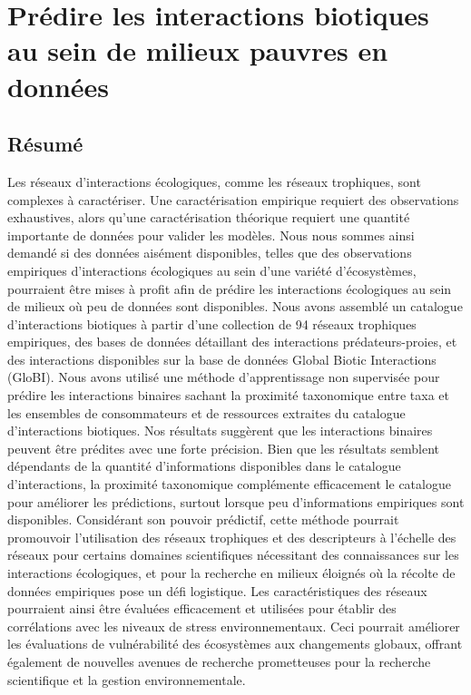 \chapter{Prédire les interactions biotiques au sein de milieux pauvres en données}
\label{chap2}

\section{Résumé}

Les réseaux d’interactions écologiques, comme les réseaux trophiques, sont complexes à caractériser. Une caractérisation empirique requiert des observations exhaustives, alors qu’une caractérisation théorique requiert une quantité importante de données pour valider les modèles. Nous nous sommes ainsi demandé si des données aisément disponibles, telles que des observations empiriques d’interactions écologiques au sein d’une variété d’écosystèmes, pourraient être mises à profit afin de prédire les interactions écologiques au sein de milieux où peu de données sont disponibles. Nous avons assemblé un catalogue d’interactions biotiques à partir d’une collection de 94 réseaux trophiques empiriques, des bases de données détaillant des interactions prédateurs-proies, et des interactions disponibles sur la base de données Global Biotic Interactions (GloBI). Nous avons utilisé une méthode d’apprentissage non supervisée pour prédire les interactions binaires sachant la proximité taxonomique entre taxa et les ensembles de consommateurs et de ressources extraites du catalogue d’interactions biotiques. Nos résultats suggèrent que les interactions binaires peuvent être prédites avec une forte précision. Bien que les résultats semblent dépendants de la quantité d’informations disponibles dans le catalogue d’interactions, la proximité taxonomique complémente efficacement le catalogue pour améliorer les prédictions, surtout lorsque peu d’informations empiriques sont disponibles. Considérant son pouvoir prédictif, cette méthode pourrait promouvoir l’utilisation des réseaux trophiques et des descripteurs à l’échelle des réseaux pour certains domaines scientifiques nécessitant des connaissances sur les interactions écologiques, et pour la recherche en milieux éloignés où la récolte de données empiriques pose un défi logistique. Les caractéristiques des réseaux pourraient ainsi être évaluées efficacement et utilisées pour établir des corrélations avec les niveaux de stress environnementaux. Ceci pourrait améliorer les évaluations de vulnérabilité des écosystèmes aux changements globaux, offrant également de nouvelles avenues de recherche prometteuses pour la recherche scientifique et la gestion environnementale.

